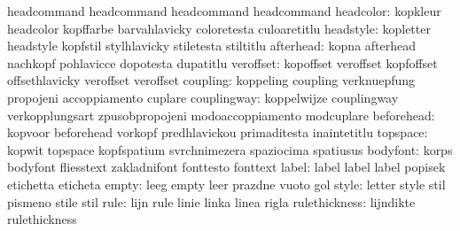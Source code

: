                            headcommand               headcommand
                           headcommand               headcommand
                headcolor: kopkleur                  headcolor
                           kopffarbe                 barvahlavicky
                           coloretesta               culoaretitlu
                headstyle: kopletter                 headstyle
                           kopfstil                  stylhlavicky
                           stiletesta                stiltitlu
                afterhead: kopna                     afterhead
                           nachkopf                  pohlavicce
                           dopotesta                 dupatitlu
                veroffset: kopoffset                 veroffset
                           kopfoffset                offsethlavicky
                           veroffset                 veroffset %
                 coupling: koppeling                 coupling
                           verknuepfung              propojeni
                           accoppiamento             cuplare
              couplingway: koppelwijze               couplingway
                           verkopplungsart           zpusobpropojeni
                           modoaccoppiamento         modcuplare
               beforehead: kopvoor                   beforehead
                           vorkopf                   predhlavickou
                           primaditesta              inaintetitlu
                 topspace: kopwit                    topspace
                           kopfspatium               svrchnimezera
                           spaziocima                spatiusus
                 bodyfont: korps                     bodyfont
                           fliesstext                zakladnifont
                           fonttesto                 fonttext
                    label: label                     label
                           label                     popisek
                           etichetta                 eticheta
                    empty: leeg                      empty
                           leer                      prazdne
                           vuoto                     gol
                    style: letter                    style
                           stil                      pismeno
                           stile                     stil
                     rule: lijn                      rule
                           linie                     linka
                           linea                     rigla
            rulethickness: lijndikte                 rulethickness
